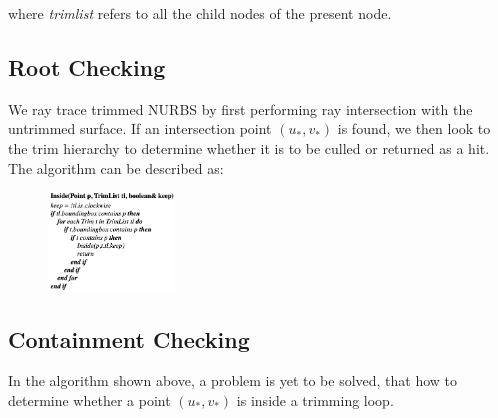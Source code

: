 \documentclass[acmtog]{acmart}
\begin{document}
where \textit{trimlist} refers to all the child nodes of the present node.

\subsection{Root Checking}
\hspace*{8pt}
We ray trace trimmed NURBS by first performing ray intersection with the untrimmed surface. If an intersection point $\left(u_*, v_*\right)$ is found, we then look to the trim hierarchy to determine whether it is to be culled or returned as a hit. The algorithm can be described as:
\begin{figure}[htbp]
    \centering
    \includegraphics[width=0.3\textwidth, height=0.25\textwidth]{algo2.png}
\end{figure}

\subsection{Containment Checking}
\hspace*{8pt}
In the algorithm shown above, a problem is yet to be solved, that how to determine whether a point $(u_*,v_*)$ is inside a trimming loop.
\end{document}
